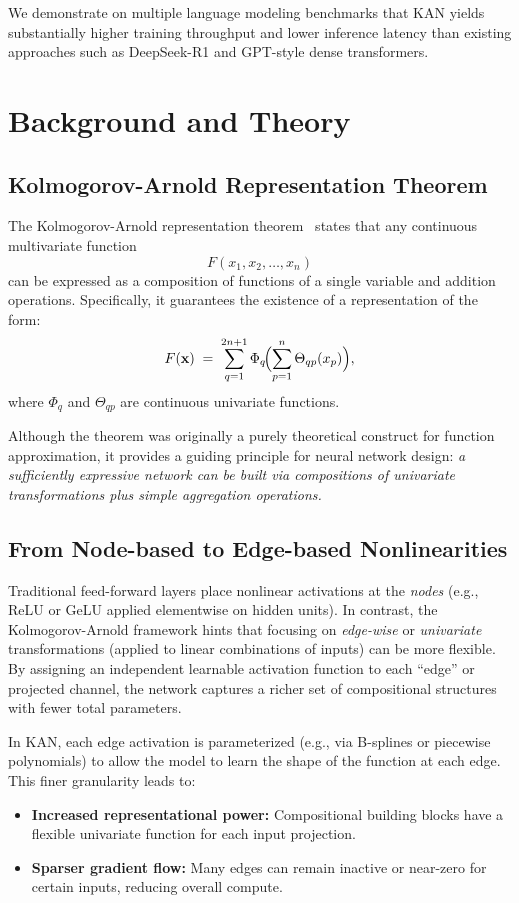 \documentclass[twocolumn]{article}
\begin{document}
We demonstrate on multiple language modeling benchmarks that KAN yields substantially higher training throughput and lower inference latency than existing approaches such as DeepSeek-R1 and GPT-style dense transformers.

\section{Background and Theory}

\subsection{Kolmogorov-Arnold Representation Theorem}
The Kolmogorov-Arnold representation theorem~\cite{kolmogorov1957} states that any continuous multivariate function
\[
F(x_1, x_2, \dots, x_n)
\]
can be expressed as a composition of functions of a single variable and addition operations. Specifically, it guarantees the existence of a representation of the form:
\[
F(\mathbf{x}) \;=\; \sum_{q=1}^{2n+1} \Phi_q\!\Bigl(\sum_{p=1}^{n} \Theta_{qp}(x_p)\Bigr),
\]
where $\Phi_q$ and $\Theta_{qp}$ are continuous univariate functions.

Although the theorem was originally a purely theoretical construct for function approximation, it provides a guiding principle for neural network design: \emph{a sufficiently expressive network can be built via compositions of univariate transformations plus simple aggregation operations.} 

\subsection{From Node-based to Edge-based Nonlinearities}
Traditional feed-forward layers place nonlinear activations at the \emph{nodes} (e.g., ReLU or GeLU applied elementwise on hidden units). In contrast, the Kolmogorov-Arnold framework hints that focusing on \emph{edge-wise} or \emph{univariate} transformations (applied to linear combinations of inputs) can be more flexible. By assigning an independent learnable activation function to each ``edge'' or projected channel, the network captures a richer set of compositional structures with fewer total parameters.

In KAN, each edge activation is parameterized (e.g., via B-splines or piecewise polynomials) to allow the model to learn the shape of the function at each edge. This finer granularity leads to:
\begin{itemize}
    \item \textbf{Increased representational power:} Compositional building blocks have a flexible univariate function for each input projection.
    \item \textbf{Sparser gradient flow:} Many edges can remain inactive or near-zero for certain inputs, reducing overall compute.
\end{itemize}
\end{document}

